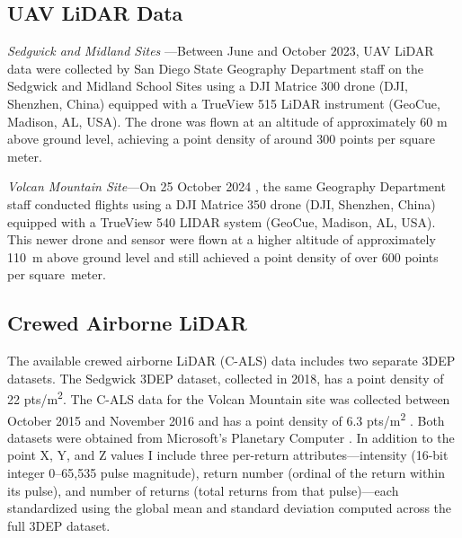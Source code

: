 \documentclass[12pt]{report}
\begin{document}
\subsection{UAV LiDAR Data}
\textit{Sedgwick and Midland Sites
}---Between June and October 2023, UAV LiDAR data were collected by San Diego State Geography Department staff on the Sedgwick and Midland School Sites using a DJI Matrice 300 drone (DJI, Shenzhen, China) equipped with a TrueView 515 LiDAR instrument (GeoCue, Madison, AL, USA). The drone was flown at an altitude of approximately 60 m above ground level, achieving a point density of around 300 points per square meter.

\textit{Volcan Mountain Site}---On 25 October 2024
, the same Geography Department staff conducted flights using a DJI Matrice 350 drone (DJI, Shenzhen, China) equipped with a TrueView 540 LIDAR system (GeoCue, Madison, AL, USA). This newer drone and sensor were flown at a higher altitude of approximately \mbox{110 m} above ground level and still achieved a point density of over 600 points per \mbox{square meter}.

\subsection{Crewed Airborne LiDAR}
The available crewed airborne LiDAR (C-ALS) data includes two separate 3DEP datasets. The Sedgwick 3DEP dataset, collected in 2018, has a point density of 22 pts/m\textsuperscript{2}. The C-ALS data for the Volcan Mountain site was collected between October 2015 and November 2016 and has a point density of 6.3 pts/m\textsuperscript{2} \citep{usgs_usgs_2016}. Both datasets were obtained from Microsoft's Planetary Computer \citep{us_geological_survey_3d_elevation_program_usgs_2023,planetary_computer}.
In addition to the point X, Y, and Z values I include three per-return attributes—intensity (16-bit integer 0–65,535 pulse magnitude), return number (ordinal of the return within its pulse), and number of returns (total returns from that pulse)—each standardized using the global mean and standard deviation computed across the full 3DEP dataset.
\end{document}
